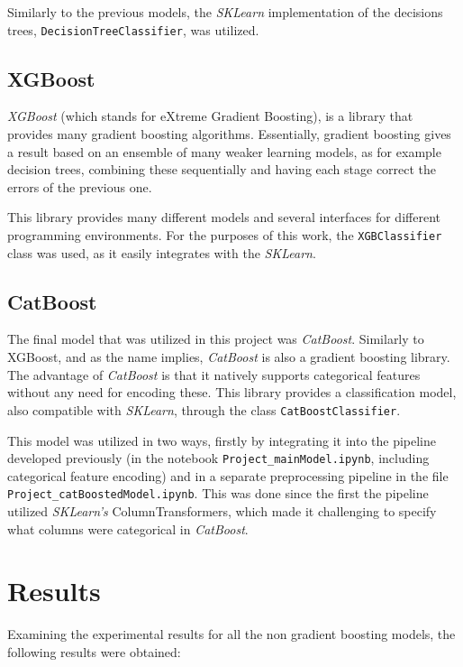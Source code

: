 \documentclass{IEEEtran}
\begin{document}
Similarly to the previous models, the \textit{SKLearn} implementation of the decisions trees, \texttt{DecisionTreeClassifier}, was utilized.

\subsection{XGBoost}

\textit{XGBoost} (which stands for eXtreme Gradient Boosting), is a library that provides many gradient boosting algorithms. Essentially, gradient boosting gives a result based on an ensemble of many weaker learning models, as for example decision trees, combining these sequentially and having each stage correct the errors of the previous one.

This library provides many different models and several interfaces for different programming environments. For the purposes of this work, the \texttt{XGBClassifier} class was used, as it easily integrates with the \textit{SKLearn}.

\subsection{CatBoost}

The final model that was utilized in this project was \textit{CatBoost}. Similarly to XGBoost, and as the name implies, \textit{CatBoost} is also a gradient boosting library. The advantage of \textit{CatBoost} is that it natively supports categorical features without any need for encoding these. This library provides a classification model, also compatible with \textit{SKLearn}, through the class \texttt{CatBoostClassifier}.

This model was utilized in two ways, firstly by integrating it into the pipeline developed previously (in the notebook \texttt{Project\_mainModel.ipynb}, including categorical feature encoding) and in a separate preprocessing pipeline in the file \texttt{Project\_catBoostedModel.ipynb}. This was done since the first the pipeline utilized \textit{SKLearn's} ColumnTransformers, which made it challenging to specify what columns were categorical in \textit{CatBoost}.

\section{Results}

Examining the experimental results for all the non gradient boosting models, the following results were obtained:
\end{document}

